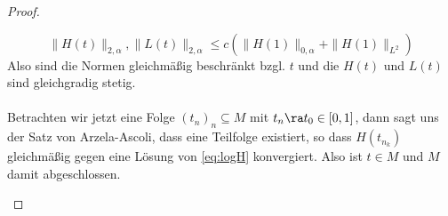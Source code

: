 \begin{proof}
\begin{itemize}
      \[
      \|H(t)\|_{2, \alpha}, \|L(t)\|_{2, \alpha} \leq c ( \|H(1)\|_{0, \alpha} + \|H(1)\|_{L^2})
      \]
      Also sind die Normen gleichmäßig beschränkt bzgl. $t$ und die $H(t)$ und $L(t)$ sind gleichgradig stetig. \\
      \\
      Betrachten wir jetzt eine Folge $(t_n)_n \subseteq M$ mit $t_n \ra t_0 \in [0,1]$, dann sagt uns der Satz von Arzela-Ascoli, dass eine Teilfolge existiert, so dass $H(t_{n_k})$ gleichmäßig gegen eine Lösung von \eqref{eq:logH} konvergiert. Also ist $t \in M$ und $M$ damit abgeschlossen.


  \end{itemize}
\end{proof}

